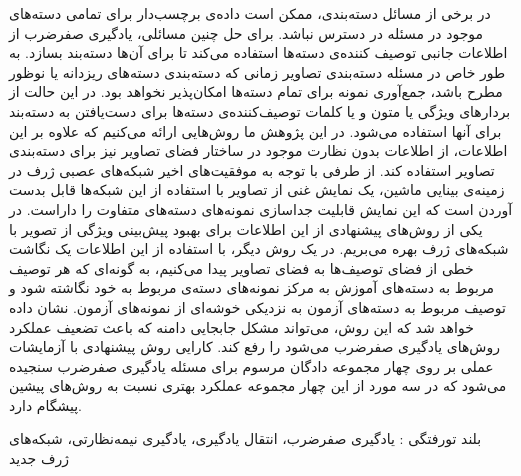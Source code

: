 


\pagestyle{empty}

در برخی از مسائل دسته‌بندی، ممکن است داده‌ی برچسب‌دار برای تمامی دسته‌های موجود در مسئله در دسترس نباشد. برای حل چنین مسائلی، یادگیری صفرضرب از اطلاعات جانبی توصیف کننده‌ی دسته‌ها استفاده می‌کند تا برای آن‌ها دسته‌بند بسازد. به طور خاص در مسئله دسته‌بندی تصاویر زمانی که دسته‌بندی دسته‌های ریزدانه یا نوظور مطرح باشد، جمع‌آوری نمونه برای تمام دسته‌ها امکان‌پذیر نخواهد بود. در این حالت از بردارهای ویژگی یا متون و یا کلمات توصیف‌کننده‌ی دسته‌ها برای دست‌یافتن به دسته‌بند برای آنها استفاده می‌شود. در این پژوهش ما روش‌هایی ارائه می‌کنیم که علاوه بر این اطلاعات، از اطلاعات بدون نظارت موجود در ساختار فضای تصاویر نیز برای دسته‌بندی تصاویر استفاده کند. از طرفی با توجه به موفقیت‌های اخیر شبکه‌های عصبی ژرف در زمینه‌ی بینایی ماشین، یک نمایش غنی از تصاویر با استفاده از این شبکه‌ها قابل بدست آوردن است که این نمایش قابلیت جداسازی نمونه‌های دسته‌های متفاوت را داراست.  در یکی از روش‌های پیشنهادی از این اطلاعات برای بهبود پیش‌بینی ویژگی‌ از تصویر با شبکه‌های ژرف بهره می‌بریم. در یک روش دیگر، با استفاده از این اطلاعات یک نگاشت خطی از فضای توصیف‌ها به فضای تصاویر پیدا می‌کنیم، به گونه‌ای که هر توصیف مربوط به دسته‌های آموزش به مرکز نمونه‌های دسته‌ی مربوط به خود نگاشته شود و توصیف مربوط به دسته‌های آزمون به نزدیکی خوشه‌ای از نمونه‌های آزمون. نشان داده خواهد شد که این روش،
می‌تواند مشکل جابجایی دامنه که باعث تضعیف عملکرد روش‌های یادگیری صفرضرب می‌شود را رفع کند. کارایی روش پیشنهادی با آزمایشات عملی بر روی چهار مجموعه دادگان مرسوم برای مسئله یادگیری صفرضرب سنجیده می‌شود که در سه مورد از این چهار مجموعه عملکرد بهتری نسبت به روش‌های پیشین پیشگام دارد.


‌بلند
‌تورفتگی : 
یادگیری صفرضرب، انتقال یادگیری، یادگیری نیمه‌نظارتی، شبکه‌های ژرف
‌جدید
